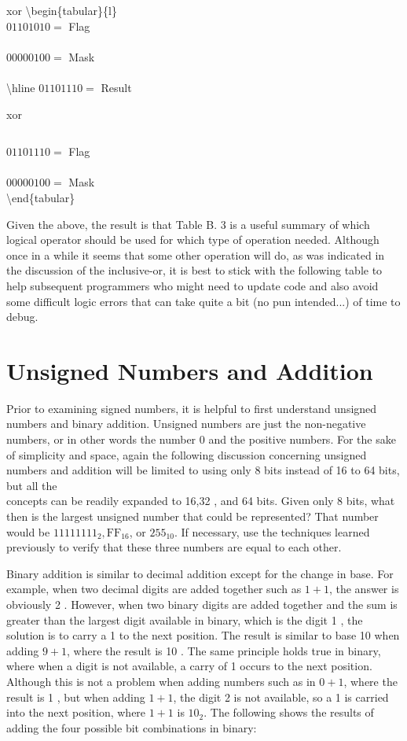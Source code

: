 \documentclass[10pt]{book}
\begin{document}
xor \textbackslash begin\{tabular\}\{l\}\\
$01101010=$ Flag \\
\\
$00000100=$ Mask \\
\\
\textbackslash hline $01101110=$ Result

 xor $\quad$\begin{tabular}{l}
\end{tabular}

$01101110=$ Flag \\
\\
$00000100=$ Mask\\
\textbackslash end\{tabular\}

Given the above, the result is that Table B. 3 is a useful summary of which logical operator should be used for which type of operation needed. Although once in a while it seems that some other operation will do, as was indicated in the discussion of the inclusive-or, it is best to stick with the following table to help subsequent programmers who might need to update code and also avoid some difficult logic errors that can take quite a bit (no pun intended...) of time to debug.

\section{Unsigned Numbers and Addition}
Prior to examining signed numbers, it is helpful to first understand unsigned numbers and binary addition. Unsigned numbers are just the non-negative numbers, or in other words the number 0 and the positive numbers. For the sake of simplicity and space, again the following discussion concerning unsigned numbers and addition will be limited to using only 8 bits instead of 16 to 64 bits, but all the\\
concepts can be readily expanded to 16,32 , and 64 bits. Given only 8 bits, what then is the largest unsigned number that could be represented? That number would be $11111111_{2}, \mathrm{FF}_{16}$, or $255_{10}$. If necessary, use the techniques learned previously to verify that these three numbers are equal to each other.

Binary addition is similar to decimal addition except for the change in base. For example, when two decimal digits are added together such as $1+1$, the answer is obviously 2 . However, when two binary digits are added together and the sum is greater than the largest digit available in binary, which is the digit 1 , the solution is to carry a 1 to the next position. The result is similar to base 10 when adding $9+1$, where the result is 10 . The same principle holds true in binary, where when a digit is not available, a carry of 1 occurs to the next position. Although this is not a problem when adding numbers such as in $0+1$, where the result is 1 , but when adding $1+1$, the digit 2 is not available, so a 1 is carried into the next position, where $1+1$ is $10_{2}$. The following shows the results of adding the four possible bit combinations in binary:
\end{document}
